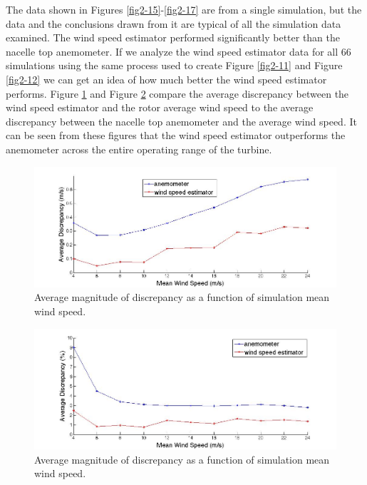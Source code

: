 The data shown in Figures \ref{fig2-15}-\ref{fig2-17} are from a single simulation, but the data and the conclusions drawn from it are typical of all the simulation data examined. The wind speed estimator performed significantly better than the nacelle top anemometer. If we analyze the wind speed estimator data for all 66 simulations using the same process used to create Figure \ref{fig2-11} and Figure \ref{fig2-12} we can get an idea of how much better the wind speed estimator performs. Figure \ref{fig2-18} and Figure \ref{fig2-19} compare the average discrepancy between the wind speed estimator and the rotor average wind speed to the average discrepancy between the nacelle top anemometer and the average wind speed. It can be seen from these figures that the wind speed estimator outperforms the anemometer across the entire operating range of the turbine. 


\begin{figure}[ht]
	\centering
		\includegraphics[width = \linewidth]{Figures/ch2Figures/fig2-18.jpg}
		
	\caption{Average magnitude of discrepancy as a function of simulation mean wind speed.}
	\label{fig2-18}
\end{figure}



\begin{figure}[ht]
	\centering
		\includegraphics[width = \linewidth]{Figures/ch2Figures/fig2-19.jpg}
		
	\caption{Average magnitude of discrepancy as a function of simulation mean wind speed.}
	\label{fig2-19}
\end{figure}


